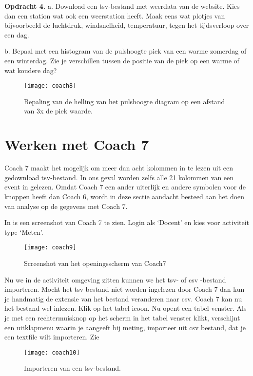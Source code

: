 \textbf{Opdracht 4.}
a.
Download een tsv-bestand met weerdata van de \hisparc website.
Kies dan een \hisparc station wat ook een weerstation heeft.
Maak eens wat plotjes van bijvoorbeeld de luchtdruk, windsnelheid, temperatuur,
tegen het tijdsverloop over een dag.

b. Bepaal met een histogram van de pulshoogte piek van een warme zomerdag of
een winterdag. Zie je verschillen tussen de positie van de piek op een warme of
wat koudere dag?

\begin{figure}
    \centering
    \texttt{[image: coach8]}
    \caption{Bepaling van de helling van het pulshoogte diagram op een afstand
    van 3x de piek waarde.}
    \label{fig:coach8}
\end{figure}

\section{Werken met Coach 7}

Coach 7 maakt het mogelijk om meer dan acht kolommen in te lezen
uit een gedownload tsv-bestand. In ons geval worden zelfs alle 21 kolommen van een event in gelezen.
Omdat Coach 7 een ander uiterlijk en andere symbolen voor de knoppen heeft dan Coach 6, wordt
in deze sectie aandacht besteed aan het doen van analyse op de gegevens met Coach 7.

In  is een screenshot van Coach 7 te zien.
Login als `Docent' en kies voor activiteit type `Meten'.


\begin{figure}
    \centering
    \texttt{[image: coach9]}
    \caption{Screenshot van het openingsscherm van Coach7}
    \label{fig:coach9}
\end{figure}

Nu we in de activiteit omgeving zitten kunnen we het tsv- of csv -bestand importeren.
Mocht het tsv bestand niet worden ingelezen door Coach 7 dan kun je handmatig de extensie
van het bestand veranderen naar csv. Coach 7 kan nu het bestand wel inlezen.
Klik op het tabel icoon. Nu opent een tabel venster.
Als je met een rechtermuisknop op het scherm in het tabel venster klikt, verschijnt
een uitklapmenu waarin je aangeeft bij meting, importeer uit csv bestand,
dat je een textfile wilt importeren.
Zie 

\begin{figure}
    \centering
    \texttt{[image: coach10]}
    \caption{Importeren van een tsv-bestand.}
    \label{fig:coach10}
\end{figure}


